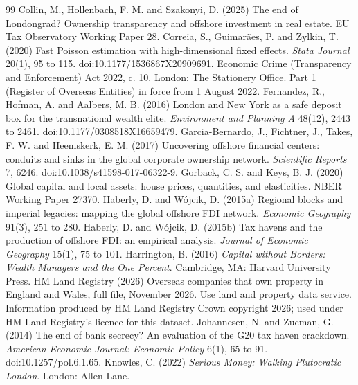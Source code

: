 \documentclass[11pt,a4paper]{article}
\begin{document}
\begin{thebibliography}{99}
 Collin, M., Hollenbach, F. M. and Szakonyi, D. (2025) The end of Londongrad? Ownership transparency and offshore investment in real estate. EU Tax Observatory Working Paper 28.
 Correia, S., Guimar\~aes, P. and Zylkin, T. (2020) Fast Poisson estimation with high-dimensional fixed effects. \textit{Stata Journal} 20(1), 95 to 115. doi:10.1177/1536867X20909691.
 Economic Crime (Transparency and Enforcement) Act 2022, c. 10. London: The Stationery Office. Part 1 (Register of Overseas Entities) in force from 1 August 2022.
 Fernandez, R., Hofman, A. and Aalbers, M. B. (2016) London and New York as a safe deposit box for the transnational wealth elite. \textit{Environment and Planning A} 48(12), 2443 to 2461. doi:10.1177/0308518X16659479.
 Garcia-Bernardo, J., Fichtner, J., Takes, F. W. and Heemskerk, E. M. (2017) Uncovering offshore financial centers: conduits and sinks in the global corporate ownership network. \textit{Scientific Reports} 7, 6246. doi:10.1038/s41598-017-06322-9.
 Gorback, C. S. and Keys, B. J. (2020) Global capital and local assets: house prices, quantities, and elasticities. NBER Working Paper 27370.
 Haberly, D. and W\'ojcik, D. (2015a) Regional blocks and imperial legacies: mapping the global offshore FDI network. \textit{Economic Geography} 91(3), 251 to 280.
 Haberly, D. and W\'ojcik, D. (2015b) Tax havens and the production of offshore FDI: an empirical analysis. \textit{Journal of Economic Geography} 15(1), 75 to 101.
 Harrington, B. (2016) \textit{Capital without Borders: Wealth Managers and the One Percent}. Cambridge, MA: Harvard University Press.
 HM Land Registry (2026) Overseas companies that own property in England and Wales, full file, November 2026. Use land and property data service. Information produced by HM Land Registry \textcopyright{} Crown copyright 2026; used under HM Land Registry's licence for this dataset.
 Johannesen, N. and Zucman, G. (2014) The end of bank secrecy? An evaluation of the G20 tax haven crackdown. \textit{American Economic Journal: Economic Policy} 6(1), 65 to 91. doi:10.1257/pol.6.1.65.
 Knowles, C. (2022) \textit{Serious Money: Walking Plutocratic London}. London: Allen Lane.

\end{thebibliography}
\end{document}
